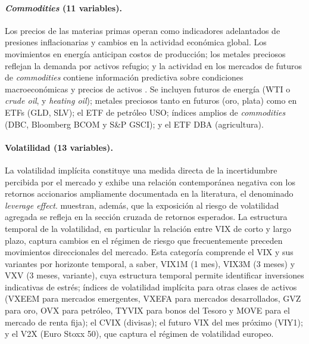 \paragraph{\textit{Commodities} (11 variables).}
Los precios de las materias primas operan como indicadores adelantados de presiones inflacionarias y cambios en la actividad econ\'omica global. Los movimientos en energ\'ia anticipan costos de producci\'on; los metales preciosos reflejan la demanda por activos refugio; y la actividad en los mercados de futuros de \textit{commodities} contiene informaci\'on predictiva sobre condiciones macroecon\'omicas y precios de activos \citep{hong2012}. Se incluyen futuros de energ\'ia (WTI o \textit{crude oil}, y \textit{heating oil}); metales preciosos tanto en futuros (oro, plata) como en ETFs (GLD, SLV); el ETF de petr\'oleo USO; \'indices amplios de \textit{commodities} (DBC, Bloomberg BCOM y S\&P GSCI); y el ETF DBA (agricultura).

\paragraph{Volatilidad (13 variables).}
La volatilidad impl\'icita constituye una medida directa de la incertidumbre percibida por el mercado y exhibe una relaci\'on contempor\'anea negativa con los retornos accionarios ampliamente documentada en la literatura, el denominado \textit{leverage effect}. \citet{ang2006} muestran, adem\'as, que la exposici\'on al riesgo de volatilidad agregada se refleja en la secci\'on cruzada de retornos esperados. La estructura temporal de la volatilidad, en particular la relaci\'on entre VIX de corto y largo plazo, captura cambios en el r\'egimen de riesgo que frecuentemente preceden movimientos direccionales del mercado. Esta categor\'ia comprende el VIX y sus variantes por horizonte temporal, a saber, VIX1M (1 mes), VIX3M (3 meses) y VXV (3 meses, variante), cuya estructura temporal permite identificar inversiones indicativas de estr\'es; \'indices de volatilidad impl\'icita para otras clases de activos (VXEEM para mercados emergentes, VXEFA para mercados desarrollados, GVZ para oro, OVX para petr\'oleo, TYVIX para bonos del Tesoro y MOVE para el mercado de renta fija); el CVIX (divisas); el futuro VIX del mes pr\'oximo (VIY1); y el V2X (Euro Stoxx 50), que captura el r\'egimen de volatilidad europeo.

